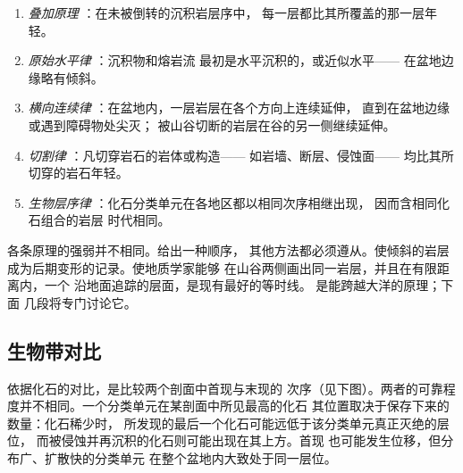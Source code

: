 \begin{definition}[地层学原理]\label{def:b1:stratigraphic-scale:principles}
\begin{enumerate}
  \item \emph{叠加原理}
：在未被倒转的沉积岩层序中，
        每一层都比其所覆盖的那一层年轻。
  \item \emph{原始水平律}
：沉积物和熔岩流
        最初是水平沉积的，或近似水平——
        在盆地边缘略有倾斜。
  \item \emph{横向连续律}
：在盆地内，一层岩层在各个方向上连续延伸，
        直到在盆地边缘或遇到障碍物处尖灭；
        被山谷切断的岩层在谷的另一侧继续延伸。
  \item \emph{切割律}
：凡切穿岩石的岩体或构造——
        如岩墙、断层、侵蚀面——
        均比其所切穿的岩石年轻。
  \item \emph{生物层序律}
：化石分类单元在各地区都以相同次序相继出现，
        因而含相同化石组合的岩层
        时代相同。
\end{enumerate}
\end{definition}

各条原理的强弱并不相同。给出一种顺序，
其他方法都必须遵从。使倾斜的岩层
成为后期变形的记录。使地质学家能够
在山谷两侧画出同一岩层，并且在有限距离内，一个
沿地面追踪的层面，是现有最好的等时线。
是能跨越大洋的原理；下面
几段将专门讨论它。

\subsection*{生物带对比}

依据化石的对比，是比较两个剖面中首现与末现的
次序（见下图）。两者的可靠程度并不相同。一个分类单元在某剖面中所见最高的化石
其位置取决于保存下来的数量：化石稀少时，
所发现的最后一个化石可能远低于该分类单元真正灭绝的层位，
而被侵蚀并再沉积的化石则可能出现在其上方。首现
也可能发生位移，但分布广、扩散快的分类单元
在整个盆地内大致处于同一层位。

